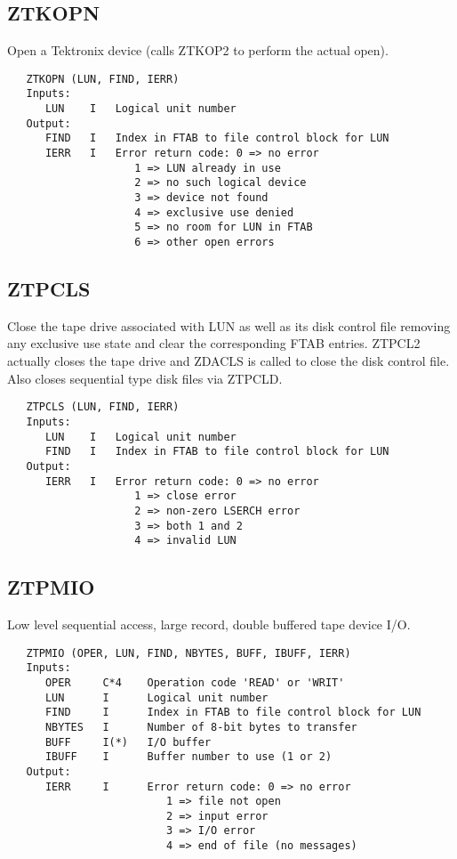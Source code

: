 \subsection{ZTKOPN}
Open a Tektronix device (calls ZTKOP2 to perform the actual open).
\begin{verbatim}
   ZTKOPN (LUN, FIND, IERR)
   Inputs:
      LUN    I   Logical unit number
   Output:
      FIND   I   Index in FTAB to file control block for LUN
      IERR   I   Error return code: 0 => no error
                    1 => LUN already in use
                    2 => no such logical device
                    3 => device not found
                    4 => exclusive use denied
                    5 => no room for LUN in FTAB
                    6 => other open errors

\end{verbatim}

\subsection{ZTPCLS}
Close the tape drive associated with LUN as well as its disk control
file removing any exclusive use state and clear the corresponding
FTAB entries.  ZTPCL2 actually closes the tape drive and ZDACLS is
called to close the disk control file.  Also closes sequential type
disk files via ZTPCLD.
\begin{verbatim}
   ZTPCLS (LUN, FIND, IERR)
   Inputs:
      LUN    I   Logical unit number
      FIND   I   Index in FTAB to file control block for LUN
   Output:
      IERR   I   Error return code: 0 => no error
                    1 => close error
                    2 => non-zero LSERCH error
                    3 => both 1 and 2
                    4 => invalid LUN

\end{verbatim}

\subsection{ZTPMIO}
Low level sequential access, large record, double buffered tape
device I/O.
\begin{verbatim}
   ZTPMIO (OPER, LUN, FIND, NBYTES, BUFF, IBUFF, IERR)
   Inputs:
      OPER     C*4    Operation code 'READ' or 'WRIT'
      LUN      I      Logical unit number
      FIND     I      Index in FTAB to file control block for LUN
      NBYTES   I      Number of 8-bit bytes to transfer
      BUFF     I(*)   I/O buffer
      IBUFF    I      Buffer number to use (1 or 2)
   Output:
      IERR     I      Error return code: 0 => no error
                         1 => file not open
                         2 => input error
                         3 => I/O error
                         4 => end of file (no messages)

\end{verbatim}


